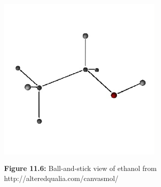	\begin{figure}[H] %
    \begin{center}
    \label{m38120*uid101!!!underscore!!!media}\label{m38120*uid10123!!!underscore!!!printimage}\includegraphics[width=300px]{col11305.imgs/m38120_canvasmol.png} %
        
      \vspace{2pt}
    \vspace{\rubberspace}\par \begin{cnxcaption}
	  \small \textbf{Figure 11.6: }Ball-and-stick view of ethanol from http://alteredqualia.com/canvasmol/\footnotemark{}
	\end{cnxcaption}
      
    \vspace{.1in}
    
    \end{center}

 \end{figure}   

    \addtocounter{footnote}{-1}

\par 
\label{m38120*secfhsst!!!underscore!!!id115}
